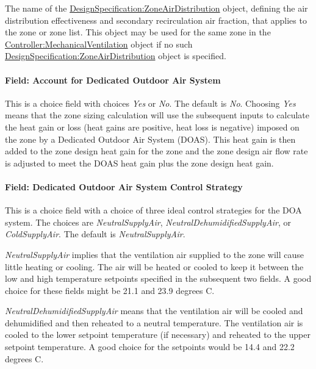 The name of the \hyperref[designspecificationzoneairdistribution]{DesignSpecification:ZoneAirDistribution} object, defining the air distribution effectiveness and secondary recirculation air fraction, that applies to the zone or zone list. This object may be used for the same zone in the \hyperref[controllermechanicalventilation]{Controller:MechanicalVentilation} object if no such \hyperref[designspecificationzoneairdistribution]{DesignSpecification:ZoneAirDistribution} object is specified.

\paragraph{Field: Account for Dedicated Outdoor Air System}\label{field-account-for-dedicated-outdoor-air-system}

This is a choice field with choices \emph{Yes} or \emph{No}. The default is \emph{No}. Choosing \emph{Yes} means that the zone sizing calculation will use the subsequent inputs to calculate the heat gain or loss (heat gains are positive, heat loss is negative) imposed on the zone by a Dedicated Outdoor Air System (DOAS). This heat gain is then added to the zone design heat gain for the zone and the zone design air flow rate is adjusted to meet the DOAS heat gain plus the zone design heat gain.

\paragraph{Field: Dedicated Outdoor Air System Control Strategy}\label{field-dedicated-outdoor-air-system-control-strategy}

This is a choice field with a choice of three ideal control strategies for the DOA system. The choices are \emph{NeutralSupplyAir}, \emph{NeutralDehumidifiedSupplyAir}, or \emph{ColdSupplyAir}. The default is \emph{NeutralSupplyAir}.

\emph{NeutralSupplyAir} implies that the ventilation air supplied to the zone will cause little heating or cooling. The air will be heated or cooled to keep it between the low and high temperature setpoints specified in the subsequent two fields. A good choice for these fields might be 21.1 and 23.9 degrees C.

\emph{NeutralDehumidifiedSupplyAir} means that the ventilation air will be cooled and dehumidified and then reheated to a neutral temperature. The ventilation air is cooled to the lower setpoint temperature (if necessary) and reheated to the upper setpoint temperature. A good choice for the setpoints would be 14.4 and 22.2 degrees C.

